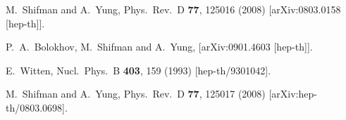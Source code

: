 \documentclass[12pt]{article}
\begin{document}
\begin{thebibliography}{99}
  M.~Shifman and A.~Yung,
  Phys.\ Rev.\  D {\bf 77}, 125016 (2008)
  [arXiv:0803.0158 [hep-th]].
     
  P.~A.~Bolokhov, M.~Shifman and A.~Yung,
  [arXiv:0901.4603 [hep-th]].

E.~Witten,
  Nucl.\ Phys.\ B {\bf 403}, 159 (1993)
  [hep-th/9301042].

M.~Shifman and A.~Yung,
Phys.\ Rev.\ D {\bf 77}, 125017 (2008)
[arXiv:hep-th/0803.0698].

\end{thebibliography}
\end{document}
